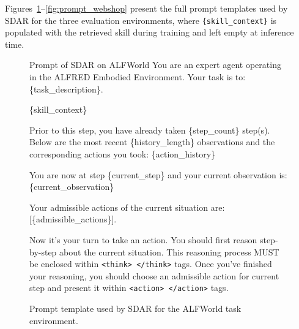 \documentclass{article} %
\newcommand{\methodname}{\textsc{SDAR}\xspace}
\begin{document}
Figures~\ref{fig:prompt_alfworld}--\ref{fig:prompt_webshop} present the full prompt templates used by \methodname{} for the three evaluation environments, where \texttt{\{skill\_context\}} is populated with the retrieved skill during training and left empty at inference time. 

\begin{figure}[h]
\centering
\begin{templatebox}{Prompt of \methodname on ALFWorld}
You are an expert agent operating in the ALFRED Embodied Environment. Your task is to: \{task\_description\}.

\{skill\_context\}

Prior to this step, you have already taken \{step\_count\} step(s). Below are the most recent \{history\_length\} observations and the corresponding actions you took: \{action\_history\}

You are now at step \{current\_step\} and your current observation is: \{current\_observation\}

Your admissible actions of the current situation are: [\{admissible\_actions\}].

Now it's your turn to take an action.
You should first reason step-by-step about the current situation. This reasoning process MUST be enclosed within \texttt{<think> </think>} tags.
Once you've finished your reasoning, you should choose an admissible action for current step and present it within \texttt{<action> </action>} tags.
\end{templatebox}
\caption{Prompt template used by \methodname{} for the ALFWorld task environment.}
\label{fig:prompt_alfworld}
\end{figure}
\end{document}
